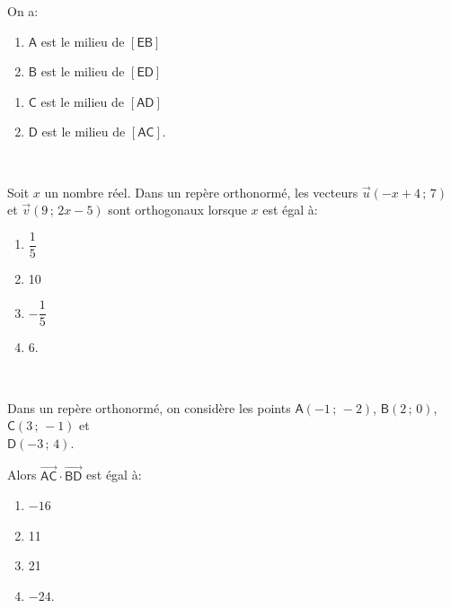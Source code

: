 \documentclass[10pt]{article}
\providecommand{\vect}[1]{\overrightarrow{#1}}
\begin{document}
\begin{description}
On a:

\begin{enumerate}[label=\textbf{\alph{*}.},itemjoin=\hfil,afterlabel={~~}]
\item $\mathsf{A}$ est le milieu de $[\mathsf{EB}]$ \item $\mathsf{B}$ est le milieu de $[\mathsf{ED}]$
\end{enumerate}

\begin{enumerate}[resume,label=\textbf{\alph{*}.},itemjoin=\hfil,afterlabel={~~}]
\item $\mathsf{C}$ est le milieu de $[\mathsf{AD}]$ \item $\mathsf{D}$ est le milieu de $[\mathsf{AC}]$.
\end{enumerate}

\item[Question 4:]\ 

Soit $x$ un nombre réel. Dans un repère orthonormé, les vecteurs $\vect{u}(-x+4\,;\,7)$ et $\vect{v}(9\,;\,2x-5)$ sont
orthogonaux lorsque $x$ est égal à:

\begin{enumerate}[label=\textbf{\alph{*}.},itemjoin=\hfil,afterlabel={~~}]
\item $\dfrac{1}{5}$
\item 10
\item $-\dfrac{1}{5}$
\item 6.
\end{enumerate}

\item[Question 5:]\ 

Dans un repère orthonormé, on considère les points $\mathsf{A}(-1\,;\,-2)$, $\mathsf{B}(2\,;\,0)$, $\mathsf{C}(3\,;\,-1)$ et\\
$\mathsf{D}(-3\,;\,4)$.

Alors $\vect{\mathsf{AC}}\cdot\vect{\mathsf{BD}}$ est égal à:

\begin{enumerate}[label=\textbf{\alph{*}.},itemjoin=\hfil,afterlabel={~~}]
\item $-16$
\item 11
\item 21
\item $-24$.
\end{enumerate}
\end{description}
\end{document}
